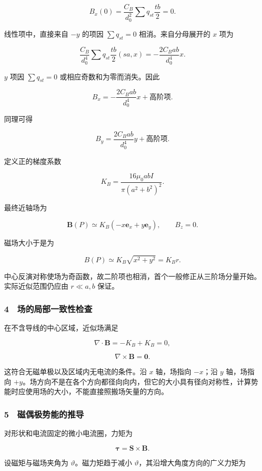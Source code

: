 \documentclass[12pt,a4paper,fontset=fandol]{ctexart}
\begin{document}
\[B_x(0)=\frac{C_B}{d_0^2}\sum q_{st}\frac{tb}{2}=0.\]

线性项中，直接来自 \(-y\) 的项因 \(\sum q_{st}=0\) 相消。来自分母展开的
\(x\) 项为

\[\frac{C_B}{d_0^4}
\sum q_{st}\frac{tb}{2}(sa,x)
=-\frac{2C_Bab}{d_0^4}x.\]

\(y\) 项因 \(\sum q_{st}=0\) 或相应奇数和为零而消失。因此

\[B_x=-\frac{2C_Bab}{d_0^4}x+\text{高阶项}.\]

同理可得

\[B_y=\frac{2C_Bab}{d_0^4}y+\text{高阶项}.\]

定义正的梯度系数

\[\boxed{K_B=\frac{16\mu_0abI}{\pi(a^2+b^2)^2}.}\]

最终近轴场为

\[\boxed{\boldsymbol B(P)
\simeq K_B(-x\boldsymbol e_x+y\boldsymbol e_y),
\qquad B_z=0.}\]

磁场大小于是为

\[\boxed{B(P)\simeq K_B\sqrt{x^2+y^2}=K_Br.}\]

中心反演对称使场为奇函数，故二阶项也相消，首个一般修正从三阶场分量开始。实际近似范围仍应由
\(r\ll a,b\) 保证。

\subsubsection{4　场的局部一致性检查}\label{ux573aux7684ux5c40ux90e8ux4e00ux81f4ux6027ux68c0ux67e5}

在不含导线的中心区域，近似场满足

\[\nabla\cdot\boldsymbol B
=-K_B+K_B=0,\]

\[\nabla\times\boldsymbol B=\boldsymbol0.\]

这符合无磁单极以及区域内无电流的条件。沿 \(x\) 轴，场指向 \(-x\)；沿
\(y\) 轴，场指向
\(+y\)。场方向不是在各个方向都径向向内，但它的大小具有径向对称性，计算势能时应使用场的大小，不能直接照搬场矢量的方向。

\subsubsection{5　磁偶极势能的推导}\label{ux78c1ux5076ux6781ux52bfux80fdux7684ux63a8ux5bfc}

对形状和电流固定的微小电流圈，力矩为

\[\boldsymbol\tau=\boldsymbol S\times\boldsymbol B.\]

设磁矩与磁场夹角为 \(\vartheta\)。磁力矩趋于减小
\(\vartheta\)，其沿增大角度方向的广义力矩为
\end{document}
